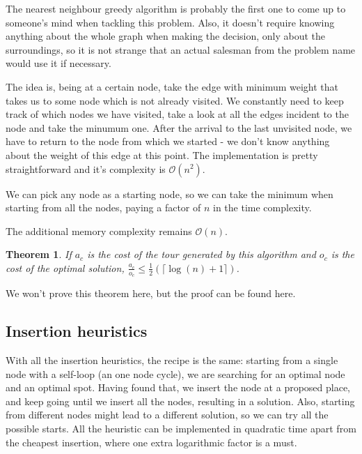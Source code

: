 \documentclass[12pt,twoside,notitlepage]{report}
\newtheorem{theorem}{Theorem}
\begin{document}
The nearest neighbour greedy algorithm is probably the first one to come up to someone's mind when tackling this problem. Also, it doesn't require knowing anything about the whole graph when making the decision, only about the surroundings, so it is not strange that an actual salesman from the problem name would use it if necessary. 

The idea is, being at a certain node, take the edge with minimum weight that takes us to some node which is not already visited. We constantly need to keep track of which nodes we have visited, take a look at all the edges incident to the node and take the minumum one. After the arrival to the last unvisited node, we have to return to the node from which we started - we don't know anything about the weight of this edge at this point. The implementation is pretty straightforward and it's complexity is $\mathcal{O}(n^2)$. 

We can pick any node as a starting node, so we can take the minimum when starting from all the nodes, paying a factor of $n$ in the time complexity.

The additional memory complexity remains $\mathcal{O}(n)$.

\smallskip 

\begin{theorem}

If $a_c$ is the cost of the tour generated by this algorithm and $o_c$ is the cost of the optimal solution, $\frac{a_c}{o_c} \leq \frac{1}{2}(\lceil\log(n) + 1\rceil)$.

\end{theorem}

We won't prove this theorem here, but the proof can be found here. %

\subsection{Insertion heuristics}

With all the insertion heuristics, the recipe is the same: starting from a single node with a self-loop (an one node cycle), we are searching for an optimal node and an optimal spot. Having found that, we insert the node at a proposed place, and keep going until we insert all the nodes, resulting in a solution. Also, starting from different nodes might lead to a different solution, so we can try all the possible starts. All the heuristic can be implemented in quadratic time apart from the cheapest insertion, where one extra logarithmic factor is a must.
\end{document}
